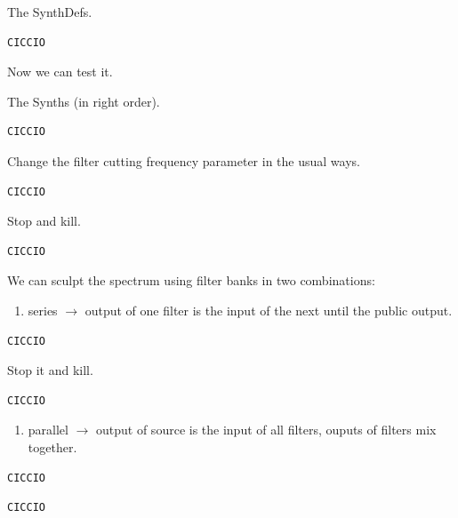 The SynthDefs.

\begin{lstlisting}[frame=single] 
CICCIO
\end{lstlisting}

Now we can test it.

The Synths (in right order).

\begin{lstlisting}[frame=single] 
CICCIO
\end{lstlisting}

Change the filter cutting frequency parameter in the usual ways.

\begin{lstlisting}[frame=single] 
CICCIO
\end{lstlisting}

Stop and kill.

\begin{lstlisting}[frame=single] 
CICCIO
\end{lstlisting}

We can sculpt the spectrum using filter banks in two combinations:

\begin{enumerate}
\def\labelenumi{\arabic{enumi}.}
\tightlist
\item series \(\rightarrow\) output of one filter is the input of the next until the public output.
\end{enumerate}

\begin{lstlisting}[frame=single] 
CICCIO
\end{lstlisting}

Stop it and kill.

\begin{lstlisting}[frame=single] 
CICCIO
\end{lstlisting}

\begin{enumerate}
\def\labelenumi{\arabic{enumi}.}
\setcounter{enumi}{1}
\tightlist
\item parallel \(\rightarrow\) output of source is the input of all filters, ouputs of filters mix together.
\end{enumerate}

\begin{lstlisting}[frame=single] 
CICCIO
\end{lstlisting}

\begin{lstlisting}[frame=single] 
CICCIO
\end{lstlisting}

